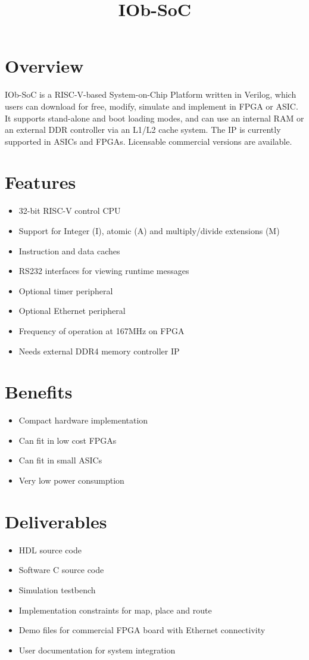 \documentclass[twocolumn]{../../submodules/UART/submodules/TEX/document/pb/pb}
\title{IOb-SoC}
\newcommand\BackgroundPic{%
\put(0,0){%
\parbox[b][\paperheight]{\paperwidth}{%
\vfill
\centering
\texttt{[image: bg.pdf]}%
\vfill
}}}
\begin{document}
\AddToShipoutPicture*{\BackgroundPic}

\section*{\textcolor[rgb]{0,0,0}{Overview}}

IOb-SoC is a RISC-V-based System-on-Chip Platform written in Verilog, which
users can download for free, modify, simulate and implement in FPGA or ASIC. It
supports stand-alone and boot loading modes, and can use an internal RAM or an
external DDR controller via an L1/L2 cache system. The IP is currently supported
in ASICs and FPGAs. Licensable commercial versions are available.

\section*{\textcolor[rgb]{0,0,0}{Features}}
\begin{itemize}
\item 32-bit RISC-V control CPU
\item Support for Integer (I), atomic (A) and multiply/divide extensions (M)
\item Instruction and data caches
\item RS232 interfaces for viewing runtime messages
\item Optional timer peripheral
\item Optional Ethernet peripheral
\item Frequency of operation at 167MHz on FPGA
\item Needs external DDR4 memory controller IP
\end{itemize}

\section*{\textcolor[rgb]{0,0,0}{Benefits}}
\begin{itemize}
\item Compact hardware implementation
\item Can fit in low cost FPGAs
\item Can fit in small ASICs 
\item Very low power consumption
\end{itemize}


\section*{\textcolor[rgb]{0,0,0}{Deliverables}}
\begin{itemize}
\item HDL source code
\item Software C source code
\item Simulation testbench
\item Implementation constraints for map, place and route
\item Demo files for commercial FPGA board with Ethernet connectivity
\item User documentation for system integration
\end{itemize}
\newpage
\end{document}
